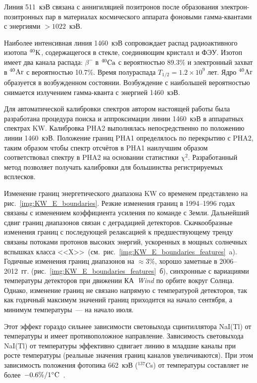 Линия 511~кэВ связана с аннигиляцией позитронов после образования электрон-позитронных 
пар в материалах космического аппарата фоновыми гамма-квантами с энергиями $>1022$~кэВ.

Наиболее интенсивная линия 1460~кэВ сопровождает распад радиоактивного 
изотопа $^{40}{\mathrm{K}}$, содержащегося в стекле, соединяющим кристалл и ФЭУ. 
Изотоп имеет два канала распада: $\beta^{-}$ в $^{40}{\mathrm{Ca}}$ с 
вероятностью 89.3\% и электронный захват в $^{40}{\mathrm{Ar}}$ с вероятностью 10.7\%. 
Время полураспада $T_{1/2}=1.2\times10^9$ лет. Ядро $^{40}{\mathrm{Ar}}$ образуется в
возбужденном состоянии. Возбуждение с наибольшей вероятностью снимается 
излучением гамма-кванта с энергией 1460~кэВ.

Для автоматической калибровки спектров автором настоящей работы была 
разработана процедура поиска и аппроксимации линии 1460~кэВ в аппаратных спектрах 
KW. Калибровка PHA2 выполнялась непосредственно по положению 
линии 1460~кэВ. Положение границ PHA1 определялось по перекрытию с PHA2, 
таким образом чтобы спектр отсчётов в PHA1 наилучшим образом соответствовал спектру в PHA2 
на основании статистики $\chi^2$. Разработанный метод позволяет получать калибровки 
для большинства регистрируемых всплесков.

Изменение границ энергетического диапазона KW со временем представлено 
на рис.~\ref{img:KW_E_boundaries}. Резкие изменения границ в 1994--1996 годах 
связаны с изменением коэффициента усиления по команде с Земли. Дальнейший сдвиг 
границ диапазонов связан с деградацией детекторов. Скачкообразные изменения границ с последующей релаксацией 
к предшествующему тренду связаны потоками протонов высоких энергий, ускоренных в мощных 
солнечных вспышках класса <<X>>\ (см.~рис.~\ref{img:KW_E_boundaries_features}~a). 
Годичные изменения границ диапазонов на $\approx 3$\%, хорошо заметные в 2006--2012~гг. 
(рис.~\ref{img:KW_E_boundaries_features}~б), синхронные с вариациями температуры детекторов при движении 
КА~\textit{Wind} по орбите вокруг Солнца. Однако, изменение границ не связано напрямую 
с температурой детекторов, так как годичный максимум значений границ приходится на 
начало сентября, а минимум температуры~--- на начало июля. 

Этот эффект гораздо сильнее зависимости световыхода сцинтиллятора NaI(Tl) 
от температуры и имеет противоположное направление. Зависимость световыхода NaI(Tl) от 
температуры эффективно сдвигает линию в младшие каналы при росте температуры 
(реальные значения границ каналов увеличиваются). При этом зависимость положения 
фотопика 662~кэВ ($^{137}$Cs) от температуры составляет 
не более~$-0.6\textrm{\%}/1^{\circ}{\mathrm{C}}$~\citep{Ianakiev_2009NIMP}.

